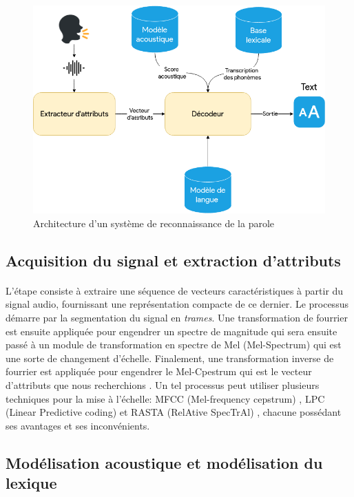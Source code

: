 \begin{figure}[H]
	\centering
	\includegraphics[width=0.70\linewidth]{images/ASR/schema.png}
	\caption{Architecture d'un système de reconnaissance de la parole \citep{speech_reco_Yu2015}}
	\label{fig:ASRSchema}
\end{figure}

\subsection{Acquisition du signal et extraction d'attributs}
\paragraph{}
L'étape consiste à extraire une séquence de vecteurs caractéristiques à partir du signal audio, fournissant une représentation compacte de ce dernier. Le processus démarre par la segmentation du signal en \textit{trames}. Une transformation de fourrier est ensuite appliquée pour engendrer un spectre de magnitude qui sera ensuite passé à un module de transformation en spectre de Mel (Mel-Spectrum) qui est une sorte de changement d'échelle. Finalement, une transformation inverse de fourrier est appliquée pour engendrer le Mel-Cpestrum qui est le vecteur d'attributs que nous recherchions \citep{asr_extraction}. Un tel processus peut utiliser plusieurs techniques pour la mise à l'échelle: MFCC (Mel-frequency cepstrum) \citep{MFCC}, LPC (Linear Predictive coding) \citep{LSP} et RASTA (RelAtive SpecTrAl) \citep{RASTA}, chacune possédant ses avantages et ses inconvénients.
\subsection{Modélisation acoustique et modélisation du lexique}
